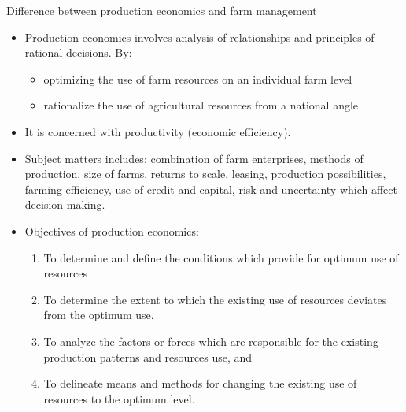 \documentclass[12pt,ignorenonframetext,aspectratio=169]{beamer}
\providecommand{\tightlist}{%
  \setlength{\itemsep}{0pt}\setlength{\parskip}{0pt}}
\begin{document}
\begin{frame}{Difference between production economics and farm
management}
\protect\hypertarget{difference-between-production-economics-and-farm-management}{}

\begin{itemize}
\tightlist
\item
  Production economics involves analysis of relationships and principles
  of rational decisions. By:

  \begin{itemize}
  \tightlist
  \item
    optimizing the use of farm resources on an individual farm level
  \item
    rationalize the use of agricultural resources from a national angle
  \end{itemize}
\item
  It is concerned with productivity (economic efficiency).
\item
  Subject matters includes: combination of farm enterprises, methods of
  production, size of farms, returns to scale, leasing, production
  possibilities, farming efficiency, use of credit and capital, risk and
  uncertainty which affect decision-making.
\end{itemize}

\end{frame}

\begin{frame}{}
\protect\hypertarget{section}{}

\begin{itemize}
\tightlist
\item
  Objectives of production economics:

  \begin{enumerate}
  \tightlist
  \item
    To determine and define the conditions which provide for optimum use
    of resources
  \item
    To determine the extent to which the existing use of resources
    deviates from the optimum use.
  \item
    To analyze the factors or forces which are responsible for the
    existing production patterns and resources use, and
  \item
    To delineate means and methods for changing the existing use of
    resources to the optimum level.
  \end{enumerate}
\end{itemize}

\end{frame}
\end{document}
